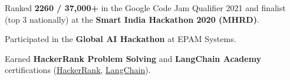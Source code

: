 \vspace*{0.85em}
\begin{zitemize}
    \item Ranked \textbf{2260 / 37,000+} in the Google Code Jam Qualifier 2021 and finalist (top 3 nationally) at the \textbf{Smart India Hackathon 2020 (MHRD)}.
    \item Participated in the \textbf{Global AI Hackathon} at EPAM Systems.
    \item Earned \textbf{HackerRank Problem Solving} and \textbf{LangChain Academy} certifications (\href{https://www.hackerrank.com/certificates/7e492a2e11be}{HackerRank}, \href{https://academy.langchain.com/certificates/vkkkoij3ke}{LangChain}).
\end{zitemize}
